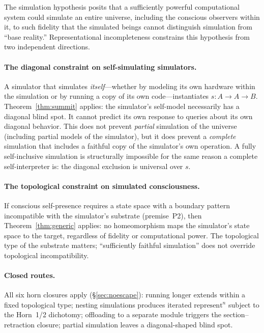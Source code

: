 \documentclass[11pt]{article}
\begin{document}
The simulation hypothesis posits that a sufficiently powerful
computational system could simulate an entire universe, including the
conscious observers within it, to such fidelity that the simulated
beings cannot distinguish simulation from ``base reality.''
Representational incompleteness constrains this hypothesis from two
independent directions.

\paragraph{The diagonal constraint on self-simulating simulators.}
A simulator that simulates \emph{itself}---whether by modeling its own
hardware within the simulation or by running a copy of its own
code---instantiates $s : A \to A \to B$.  Theorem~\ref{thm:summit}
applies: the simulator's self-model necessarily has a diagonal blind
spot.  It cannot predict its own response to queries about its own
diagonal behavior.  This does not prevent \emph{partial} simulation of
the universe (including partial models of the simulator), but it does
prevent a \emph{complete} simulation that includes a faithful copy of
the simulator's own operation.  A fully self-inclusive simulation is
structurally impossible for the same reason a complete self-interpreter
is: the diagonal exclusion is universal over $s$.

\paragraph{The topological constraint on simulated consciousness.}
If conscious self-presence requires a state space with a boundary
pattern incompatible with the simulator's substrate (premise~P2),
then Theorem~\ref{thm:generic} applies: no homeomorphism maps the
simulator's state space to the target, regardless of fidelity or
computational power.  The topological type of the substrate matters;
``sufficiently faithful simulation'' does not override topological
incompatibility.

\paragraph{Closed routes.}
All six horn closures apply (\S\ref{sec:noescape}): running longer
extends within a fixed topological type; nesting simulations produces
iterated $\mathrm{represent}^n$ subject to the Horn~1/2 dichotomy;
offloading to a separate module triggers the section--retraction
closure; partial simulation leaves a diagonal-shaped blind spot.
\end{document}
